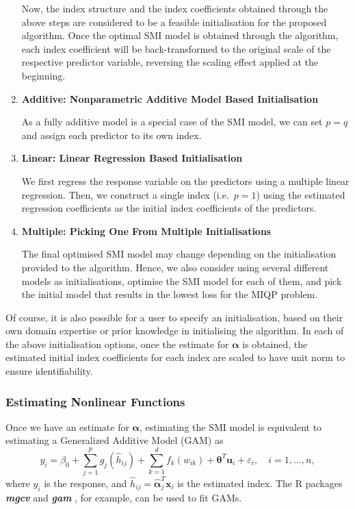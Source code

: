 \documentclass[
  11pt,
  a4paper,
]{article}
\begin{document}
\begin{enumerate}
  Now, the index structure and the index coefficients obtained through
  the above steps are considered to be a feasible initialisation for the
  proposed algorithm. Once the optimal SMI model is obtained through the
  algorithm, each index coefficient will be back-transformed to the
  original scale of the respective predictor variable, reversing the
  scaling effect applied at the beginning.
\item
  \textbf{Additive: Nonparametric Additive Model Based Initialisation}

  As a fully additive model is a special case of the SMI model, we can
  set \(p=q\) and assign each predictor to its own index.
\item
  \textbf{Linear: Linear Regression Based Initialisation}

  We first regress the response variable on the predictors using a
  multiple linear regression. Then, we construct a single index
  (i.e.~\(p = 1\)) using the estimated regression coefficients as the
  initial index coefficients of the predictors.
\item
  \textbf{Multiple: Picking One From Multiple Initialisations}

  The final optimised SMI model may change depending on the
  initialisation provided to the algorithm. Hence, we also consider
  using several different models as initialisations, optimise the SMI
  model for each of them, and pick the initial model that results in the
  lowest loss for the MIQP problem.
\end{enumerate}

Of course, it is also possible for a user to specify an initialisation,
based on their own domain expertise or prior knowledge in initialising
the algorithm. In each of the above initialisation options, once the
estimate for \(\bm{\alpha}\) is obtained, the estimated initial index
coefficients for each index are scaled to have unit norm to ensure
identifiability.

\subsubsection{Estimating Nonlinear Functions}\label{sec-step2}

Once we have an estimate for \(\bm{\alpha}\), estimating the SMI model
is equivalent to estimating a Generalized Additive Model (GAM) as \[
  y_{i} = \beta_{0} + \sum_{j = 1}^{p}g_{j}(\hat{h}_{ij}) + \sum_{k = 1}^{d}f_{k}(w_{ik}) + \bm{\theta}^{T}\bm{u}_{i} + \varepsilon_{i}, \quad i = 1, \dots, n,
\] where \(y_{i}\) is the response, and
\(\hat{h}_{ij} = \hat{\bm{\alpha}}_{j}^{T}\bm{x}_{i}\) is the estimated
index. The R packages \textbf{\emph{mgcv}} \autocite{Wood2011} and
\textbf{\emph{gam}} \autocite{Hastie2023}, for example, can be used to
fit GAMs.
\end{document}
